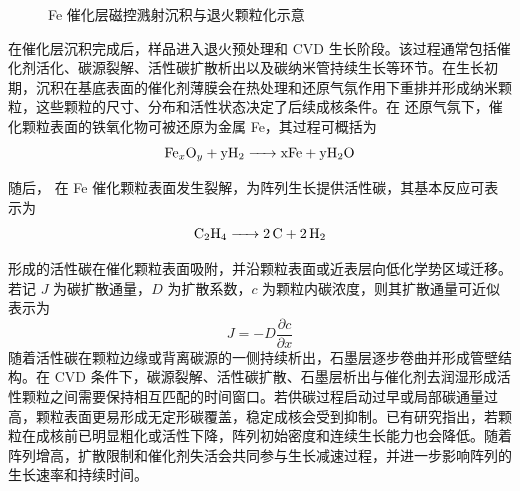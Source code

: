 \begin{figure}[htbp]
    \centering
    \caption{Fe 催化层磁控溅射沉积与退火颗粒化示意}
    \label{fig:ch2_sputter_catalyst_schematic}
\end{figure}
\FloatBarrier

在催化层沉积完成后，样品进入退火预处理和 CVD 生长阶段。该过程通常包括催化剂活化、碳源裂解、活性碳扩散析出以及碳纳米管持续生长等环节\cite{Liu2021EcoMat}。在生长初期，沉积在基底表面的催化剂薄膜会在热处理和还原气氛作用下重排并形成纳米颗粒，这些颗粒的尺寸、分布和活性状态决定了后续成核条件。在  还原气氛下，催化颗粒表面的铁氧化物可被还原为金属 Fe，其过程可概括为
\begin{equation}
\ce{Fe_xO_y + yH2 -> xFe + yH2O}
\end{equation}

随后， 在 Fe 催化颗粒表面发生裂解，为阵列生长提供活性碳，其基本反应可表示为
\begin{equation}
\ce{C2H4 -> 2C + 2H2}
\end{equation}

形成的活性碳在催化颗粒表面吸附，并沿颗粒表面或近表层向低化学势区域迁移。若记 $J$ 为碳扩散通量，$D$ 为扩散系数，$c$ 为颗粒内碳浓度，则其扩散通量可近似表示为
\begin{equation}
J = -D\frac{\partial c}{\partial x}
\end{equation}
随着活性碳在颗粒边缘或背离碳源的一侧持续析出，石墨层逐步卷曲并形成管壁结构。在 CVD 条件下，碳源裂解、活性碳扩散、石墨层析出与催化剂去润湿形成活性颗粒之间需要保持相互匹配的时间窗口。若供碳过程启动过早或局部碳通量过高，颗粒表面更易形成无定形碳覆盖，稳定成核会受到抑制。已有研究指出，若颗粒在成核前已明显粗化或活性下降，阵列初始密度和连续生长能力也会降低\cite{Liu2021EcoMat,Lee2019CatalystDewetting}。随着阵列增高，扩散限制和催化剂失活会共同参与生长减速过程\cite{Xiang2008GrowthDecelerationVACNT}，并进一步影响阵列的生长速率和持续时间。

